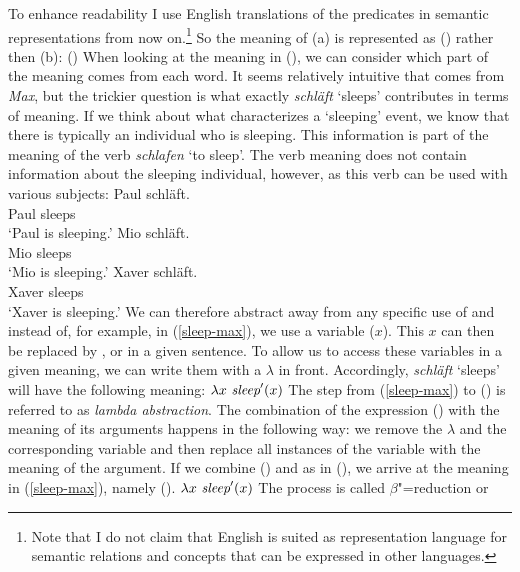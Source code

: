 \noindent
To enhance readability I use English translations of the predicates in semantic representations
from now on.\footnote{%
  Note that I do not claim that English is suited as representation language for semantic relations
  and concepts that can be expressed in other languages.
}
So the meaning of (a) is represented as () rather then (b):
\ea
\label{sleep-max}
()
\z
When looking at the meaning in (), we can consider which part of the meaning comes from each word.
It seems relatively intuitive that  comes from \emph{Max}, but the trickier question is what exactly
\emph{schläft} `sleeps' contributes in terms of meaning. If we think about what characterizes a `sleeping' event, we
know that there is typically an individual who is sleeping. This information is part of the meaning of the verb \emph{schlafen}
`to sleep'. The verb meaning does not contain information about the sleeping individual, however, as this verb can be used
with various subjects:
 \eal
\ex 
\gll Paul schläft.\\
     Paul sleeps\\
\glt `Paul is sleeping.'
\ex 
\gll Mio schläft.\\
     Mio sleeps\\
\glt `Mio is sleeping.'
\ex 
\gll Xaver schläft.\\
     Xaver sleeps\\
\glt `Xaver is sleeping.'
\zl
We can therefore abstract away from any specific use of  and instead of, for example,  in (\ref{sleep-max}), we
use a variable (\eg $x$). This $x$ can then be replaced by ,  or  in a given sentence. To allow us
to access these variables in a given meaning, we can write them with a $\lambda$ in front. Accordingly, \emph{schläft} `sleeps' will have
the following meaning:
\ea
$\lambda x~\textit{sleep}'(x)$
\z
%
The step from (\ref{sleep-max}) to () is referred to as \emph{lambda abstraction}.
The combination of the expression () with the meaning of its arguments happens in the following way: we remove the $\lambda$ and the 
corresponding variable and then replace all instances of the variable with the meaning of the
argument. If we combine () and  as in (),
we arrive at the meaning in (\ref{sleep-max}), namely (). 
\ea
$\lambda x~\textit{sleep}'(x)$ 
\z
The process is called $\beta$"=reduction or 

